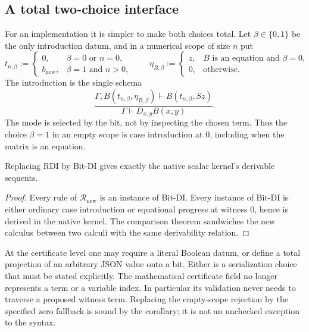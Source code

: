 \subsection{A total two-choice interface}

For an implementation it is simpler to make both choices total.  Let
$\beta\in\{0,1\}$ be the only introduction datum, and in a numerical
scope of size $n$ put
\[
 t_{n,\beta}:=
 \begin{cases}
 0,&\beta=0\text{ or }n=0,\\
 b_{\mathrm{new}},&\beta=1\text{ and }n>0,
 \end{cases}
 \qquad
 \eta_{B,\beta}:=
 \begin{cases}
 z,&B\text{ is an equation and }\beta=0,\\
 0,&\text{otherwise}.
 \end{cases}
\]
The introduction is the single schema
\[
 \frac{\Gamma,B(t_{n,\beta},\eta_{B,\beta})
        \vdash B(t_{n,\beta},Sz)}
      {\Gamma\vdash D_{x,y}B(x,y)}.
 \tag{Bit-DI}
\]
The mode is selected by the bit, not by inspecting the chosen term.
Thus the choice $\beta=1$ in an empty scope is case introduction at
$0$, including when the matrix is an equation.

\begin{corollary}
Replacing RDI by Bit-DI gives exactly the native scalar kernel's
derivable sequents.
\end{corollary}
\begin{proof}
Every rule of $\mathcal R_{\mathrm{new}}$ is an instance of Bit-DI.
Every instance of Bit-DI is either ordinary case introduction or
equational progress at witness $0$, hence is derived in the native
kernel.  The comparison theorem sandwiches the new calculus between
two calculi with the same derivability relation.
\end{proof}

At the certificate level one may require a literal Boolean datum, or
define a total projection of an arbitrary JSON value onto a bit.
Either is a serialization choice that must be stated explicitly.
The mathematical certificate field no longer represents a term or a
variable index.  In particular its validation never needs to traverse
a proposed witness term.  Replacing the empty-scope rejection by the
specified zero fallback is sound by the corollary; it is not an
unchecked exception to the syntax.
